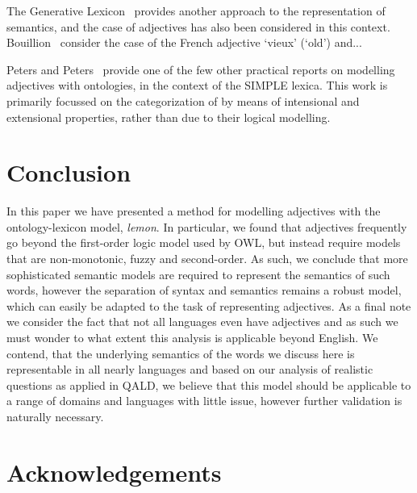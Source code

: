 \documentclass[11pt]{article}
\begin{document}
The Generative Lexicon~\cite{pustejovsky1991generative} provides another approach to the representation of semantics, and the case of adjectives has also been considered in this context. Bouillion~ consider the case of the French adjective `vieux' (`old') and...

Peters and Peters~ provide one of the few other practical reports on modelling adjectives with ontologies, in the context of the SIMPLE lexica. This work is primarily focussed on the categorization of by means of intensional and extensional properties, rather than due to their logical modelling. 

\section{Conclusion}

In this paper we have presented a method for modelling adjectives with the
ontology-lexicon model, \emph{lemon}. In particular, we found that adjectives
frequently go beyond the first-order logic model used by OWL, but instead 
require models that are non-monotonic, fuzzy and second-order. As such, we 
conclude that more sophisticated semantic models are required to represent the semantics
of such words, however the separation of syntax and semantics remains a robust
model, which can easily be adapted to the task of representing adjectives. As 
a final note we consider the fact that not all languages even have adjectives
\cite{?} and as such we must wonder to what extent this analysis is applicable
beyond English. We contend, that the underlying semantics of the words we discuss here
is representable in all nearly languages and based on our analysis of realistic
questions as applied in QALD, we believe that this model should be applicable
to a range of domains and languages with little issue, however further 
validation is naturally necessary.

\section*{Acknowledgements}



\end{document}

